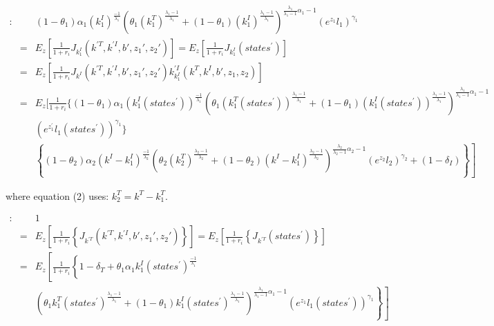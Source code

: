 \documentclass{article}
\begin{document}
\begin{eqnarray}
     [k_1^I]: & &                                                 (1- \theta_1) \alpha_1 (k_{1}^I)^{\frac{-1}{\lambda_1}} \left( \theta_1 (k_{1}^T)^{\frac{\lambda_1-1}{\lambda_1}} +(1-\theta_1)(k_{1}^I)^{\frac{\lambda_1-1}{\lambda_1}} \right)^{\frac{\lambda_1}{\lambda_1-1}\alpha_1-1} \left( e^{z_{1}}l_{1} \right)^{\gamma_1}   \nonumber \\
     & = &  E_z\left[\frac{1}{1+r_i} J_{k_1^I}(k^{\prime T},k^{\prime I},b{\prime},z_{1}{\prime },z_{2}{\prime})   \right] = E_z\left[\frac{1}{1+r_i} J_{k_1^I}(states^\prime)   \right] \nonumber \\
     & = &  E_z\left[\frac{1}{1+r_i} J_{k^I}(k^{\prime T},k^{\prime I},b{\prime},z_{1}{\prime },z_{2}{\prime}) k_{k_1^I}^{\prime I}(k^{T},k^{I},b{\prime},z_{1},z_{2})  \right] \nonumber \\
     & = &  E_z [ \frac{1}{1+r_i} \{ (1-\theta_1) \alpha_1 (k_{1}^I(states^\prime) )^{\frac{-1}{\lambda_1}}    \left( \theta_1 (k_{1}^T(states^\prime) )^{\frac{\lambda_1-1}{\lambda_1}} +(1-\theta_1)(k_{1}^I(states^\prime) )^{\frac{\lambda_1-1}{\lambda_1}} \right)^{\frac{\lambda_1}{\lambda_1-1}\alpha_1-1} \nonumber \\
     &  &    \left( e^{z_{1}^\prime}l_{1}(states^\prime) \right)^{\gamma_1}  \}   \nonumber \\
     &  &   \left. \left\lbrace (1-\theta_2) \alpha_2 (k^I - k_{1}^I)^{\frac{-1}{\lambda_2}} \left( \theta_2 (k_{2}^T)^{\frac{\lambda_2-1}{\lambda_2}} +(1-\theta_2)(k^I - k_{1}^I)^{\frac{\lambda_2-1}{\lambda_2}} \right)^{\frac{\lambda_2}{\lambda_2-1}\alpha_2-1} \left( e^{z_{2}}l_{2} \right)^{\gamma_2} +(1-\delta_I) \right\rbrace  \right] \quad 
\end{eqnarray}


where equation (2) uses: $ k_2^T = k^T - k_1^T$.

\begin{eqnarray}
     [k^{\prime T}]: & &   1  \nonumber \\
     & = & E_z\left[\frac{1}{1+r_i} \left\lbrace J_{k^{\prime T}}(k^{\prime T},k^{\prime I},b{\prime},z_{1}{\prime },z_{2}{\prime}) \right\rbrace   \right] = E_z\left[\frac{1}{1+r_i} \left\lbrace  J_{k^{\prime T}}(states^\prime) \right\rbrace  \right] \nonumber \\
     & = & E_z\left[ \frac{1}{1+r_i} \left\lbrace 1-\delta_T + \theta_1 \alpha_1 k_{1}^I(states^\prime)^{\frac{-1}{\lambda_1}} \right. \right. \nonumber \\
     &   &  \left. \left. \left( \theta_1 k_{1}^T(states^\prime)^{\frac{\lambda_1-1}{\lambda_1}} +(1-\theta_1)k_{1}^I(states^\prime) ^{\frac{\lambda_1-1}{\lambda_1}} \right)^{\frac{\lambda_1}{\lambda_1-1}\alpha_1-1}  \left( e^{z_{1}} l_1(states^\prime) \right)^{\gamma_1} \right\rbrace  \right] \quad \quad
\end{eqnarray}
\end{document}
